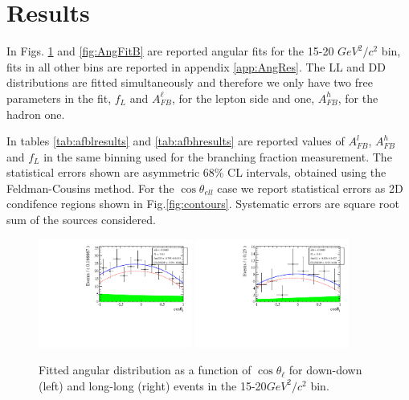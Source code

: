 \section{Results}

In Figs. \ref{fig:AngFit} and \ref{fig:AngFitB} are reported angular fits for the 15-20 $GeV^2/c^2$ \qsq bin, fits in all other \qsq bins
are reported in appendix \ref{app:AngRes}. 
The LL and DD distributions are fitted simultaneously and therefore we only have two free parameters
in the fit, $f_L$ and $A_{FB}^\ell$, for the lepton side and one, $A_{FB}^h$, for the hadron one.

In tables \ref{tab:afblresults} and \ref{tab:afbhresults} are reported values of $A_{FB}^l$, $A_{FB}^h$ and $f_L$
in the same \qsq binning used for the branching fraction measurement. 
The statistical errors shown are asymmetric 68\% CL intervals, obtained using the Feldman-Cousins method.
For the $\cos\theta_{ell}$ case we report statistical errors as 2D condifence regions shown in Fig.\ref{fig:contours}.
Systematic errors are square root sum of the sources considered.

\begin{figure}[h]
\centering
\includegraphics[width=0.45\textwidth]{Lmumu/figs/AngularDistribs/Fitted/Afb_DD_q2_1500_2000.pdf}
\includegraphics[width=0.45\textwidth]{Lmumu/figs/AngularDistribs/Fitted/Afb_LL_q2_1500_2000.pdf}
\caption{Fitted angular distribution as a function of $\cos\theta_\ell$ for down-down (left) and long-long (right) events in the 15-20$GeV^2/c^2$ \qsq bin.  }
\label{fig:AngFit}
\end{figure}

